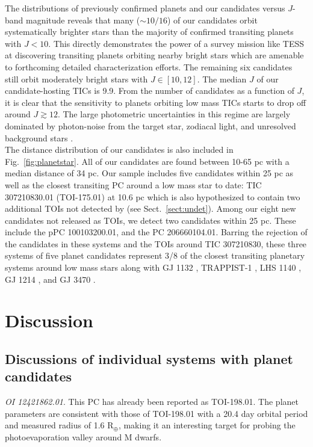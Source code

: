 The distributions of previously confirmed planets
and our candidates versus $J$-band magnitude reveals that many ($\sim 10/16$) of our candidates
orbit systematically brighter stars than the majority of confirmed transiting planets with
$J<10$. This directly demonstrates the power of a survey mission like TESS at discovering
transiting planets orbiting nearby bright stars which are amenable to forthcoming detailed
characterization efforts. The remaining six candidates still orbit moderately
bright stars with $J \in [10,12]$. The median $J$ of our candidate-hosting TICs is 9.9.
From the number of \pipeline{} candidates as a function of $J$,
it is clear that the \pipeline{} sensitivity to planets orbiting low mass TICs starts to drop
off around $J \gtrsim 12$.
The large photometric uncertainties in this regime are largely dominated by photon-noise
from the target star, zodiacal light, and unresolved background stars \citep{ricker15}. \\

The distance distribution of our candidates is also included in Fig.~\ref{fig:planetstar}. All of
our candidates are found between 10-65 pc with a median distance of 34 pc. Our sample includes
five candidates within 25 pc as well as the closest transiting PC around a low mass star to date:
TIC 307210830.01 (TOI-175.01) at 10.6 pc which is also hypothesized to contain two additional TOIs
not detected by \pipeline{} (see Sect.~\ref{sect:undet}). Among our eight new candidates not
released as TOIs, we detect two candidates within 25 pc. These include the pPC 100103200.01,
and the PC 206660104.01. Barring the rejection of the candidates in
these systems and the TOIs around TIC 307210830, these three systems of five planet candidates
represent 3/8 of the
closest transiting planetary systems around low mass stars along with GJ 1132 \citep{berta15,bonfils18},
TRAPPIST-1 \citep{gillon17,luger17}, LHS 1140 \citep{dittmann17a,ment19}, GJ 1214 \citep{charbonneau09}, and
GJ 3470 \citep{bonfils12}.


\section{Discussion} \label{sect:disc}
\subsection{Discussions of individual systems with planet candidates} \label{sect:indiv}
\emph{OI 12421862.01}. This PC has already been reported as TOI-198.01. The \pipeline{} planet parameters
are consistent with those of TOI-198.01 with a 20.4 day orbital period and measured
radius of 1.6 R$_{\oplus}$, making it an interesting target for probing the photoevaporation valley
around M dwarfs. \\

